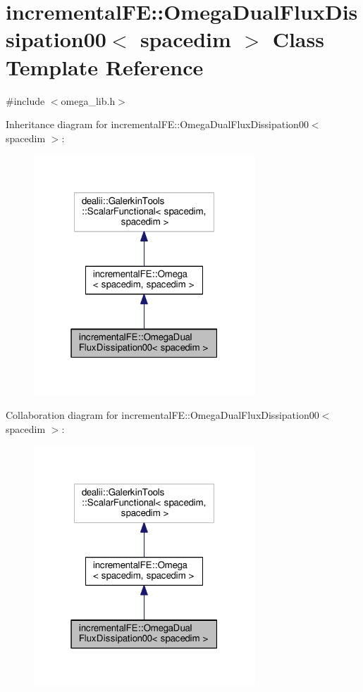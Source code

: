 \hypertarget{classincremental_f_e_1_1_omega_dual_flux_dissipation00}{}\section{incremental\+FE\+:\+:Omega\+Dual\+Flux\+Dissipation00$<$ spacedim $>$ Class Template Reference}
\label{classincremental_f_e_1_1_omega_dual_flux_dissipation00}


{\ttfamily \#include $<$omega\+\_\+lib.\+h$>$}



Inheritance diagram for incremental\+FE\+:\+:Omega\+Dual\+Flux\+Dissipation00$<$ spacedim $>$\+:\nopagebreak
\begin{figure}[H]
\begin{center}
\leavevmode
\includegraphics[width=235pt]{classincremental_f_e_1_1_omega_dual_flux_dissipation00__inherit__graph}
\end{center}
\end{figure}


Collaboration diagram for incremental\+FE\+:\+:Omega\+Dual\+Flux\+Dissipation00$<$ spacedim $>$\+:\nopagebreak
\begin{figure}[H]
\begin{center}
\leavevmode
\includegraphics[width=235pt]{classincremental_f_e_1_1_omega_dual_flux_dissipation00__coll__graph}
\end{center}
\end{figure}
